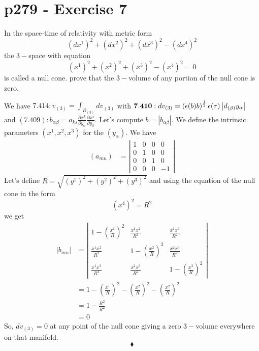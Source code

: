 \section{p279 - Exercise 7}
\begin{tcolorbox}
In the space-time of relativity with metric form
$$\left ( dx^1\right)^2+\left( dx^2\right)^2+\left ( dx^3\right)^2-\left( dx^4\right)^2$$
the $3-$space with equation 
$$\left (x^1\right)^2+\left( x^2\right)^2+\left( x^3\right)^2-\left( x^4\right)^2=0$$
is called a null cone. prove that the $3-$volume of any portion of the null cone is zero.
\end{tcolorbox}
We have $\mathbf{7.414}: v_{(3)} = \int_{R_{(3)}} dv_{(3)} $  with $\mathbf{7.410}: dv_{(3)}= \left(\epsilon(b)b\right)^{\frac{1}{2}}\epsilon(\tau)\left | d_{(\beta)}y_{\alpha}\right |$ \\
and $\mathbf{(7.409)}: b_{\alpha \beta }= a_{ks}\frac{\partial x^k}{\partial y_{\alpha}}\frac{\partial x^s}{\partial y_{\beta}}$. Let's compute $b=\left | b_{\alpha \beta }\right|$. We define the intrinsic parameters $\left(x^1, x^2,x^3\right)$ for the $\left( y_{\alpha}\right)$.
We have 
\begin{align}
\left(a_{mn}\right)&=\left |\begin{matrix}
1&0&0&0\\
0&1&0&0\\
0&0&1&0\\
0&0&0&-1
\end{matrix}\right |
\end{align}
Let's define $R=\sqrt{\left (y^1\right)^2+\left( y^2\right)^2+\left( y^3\right)^2}$ and using the equation of the null cone in the form $$\left(x^4\right)^2 = R^2$$ we get
\begin{align}
\left|b_{mn}\right|&=\left |\begin{matrix}
1-\left(\frac{x^1}{R}\right)^2&\frac{x^1 x^2}{R^2}&\frac{x^1 x^3}{R^2}\\
\frac{x^1 x^2}{R^2}&1-\left(\frac{x^2}{R}\right)^2&\frac{x^2 x^3}{R^2}\\
\frac{x^1 x^3}{R^2}&\frac{x^2 x^3}{R^2}&1-\left(\frac{x^3}{R}\right)^2
\end{matrix}\right |\\
&= 1-\left(\frac{x^1}{R}\right)^2-\left(\frac{x^2}{R}\right)^2-\left(\frac{x^2}{R}\right)^2\\
&= 1 -\frac{R^2}{R^2}\\
&=0
\end{align}
So, $dv_{(3)}=0$ at any point of the null cone giving a zero $3-$volume everywhere on that manifold.
$$\blacklozenge$$
\newpage

